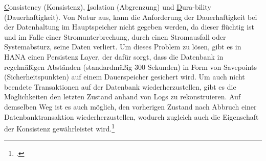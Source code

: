 \underline{C}onsistency (Konsistenz), \underline{I}solation (Abgrenzung) und \underline{D}ura-bility (Dauerhaftigkeit). Von Natur aus, kann die Anforderung der Dauerhaftigkeit bei der Datenhaltung im Hauptspeicher nicht gegeben werden, da dieser flüchtig ist und im Falle einer Stromunterbrechung, durch einen Stromausfall oder Systemabsturz, seine Daten verliert. Um dieses Problem zu lösen, gibt es in HANA einen \glqq{}Persistenz Layer\grqq{}, der dafür sorgt, dass die Datenbank in regelmäßigen Abständen (standardmäßig 300 Sekunden) in Form von \glqq{}Savepoints\grqq{} (Sicherheitspunkten) auf einem Dauerspeicher gesichert wird. Um auch nicht beendete Transaktionen auf der Datenbank wiederherzustellen, gibt es die Möglichkeiten den letzten Zustand anhand von Logs zu rekonstruieren. Auf demselben Weg ist es auch möglich, den vorherigen Zustand nach Abbruch einer Datenbanktransaktion wiederherzustellen, wodurch zugleich auch die Eigenschaft der Konsistenz gewährleistet wird.\footcite[Vgl.][]{rz10-acid}

